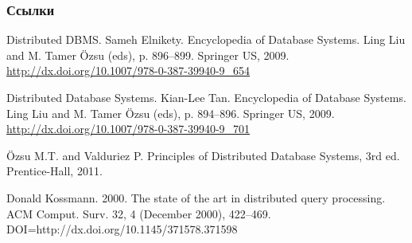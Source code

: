 \documentclass{beamer}
\begin{document}

\begin{frame}[allowframebreaks]
\frametitle{Ссылки}
\footnotesize{
\begin{thebibliography}{99}


 Distributed DBMS. Sameh Elnikety. Encyclopedia of Database Systems. Ling Liu and M. Tamer {\"O}zsu (eds), p. 896--899. Springer US, 2009. \url{http://dx.doi.org/10.1007/978-0-387-39940-9\_654}

 Distributed Database Systems. Kian-Lee Tan. Encyclopedia of Database Systems. Ling Liu and M. Tamer {\"O}zsu (eds), p. 894--896. Springer US, 2009. \url{http://dx.doi.org/10.1007/978-0-387-39940-9_701}

 {\"O}zsu M.T. and Valduriez P. Principles of Distributed Database Systems, 3rd ed. Prentice-Hall, 2011.

 Donald Kossmann. 2000. The state of the art in distributed query processing. ACM Comput. Surv. 32, 4 (December 2000), 422--469. DOI=http://dx.doi.org/10.1145/371578.371598 








\end{thebibliography}}
\end{frame}
\end{document}
